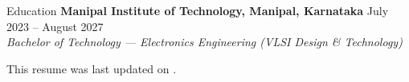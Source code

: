 \documentclass{resume} %
\begin{document}
\begin{rSection}{Education}
    {\bf Manipal Institute of Technology, Manipal, Karnataka} \hfill {July 2023 -- August 2027}  \\
    {\em Bachelor of Technology --- Electronics Engineering (VLSI Design \& Technology)} \hfill \\
\end{rSection}

\small \begin{center}This resume was last updated on \DTMnow.\\\end{center}
\end{document}

